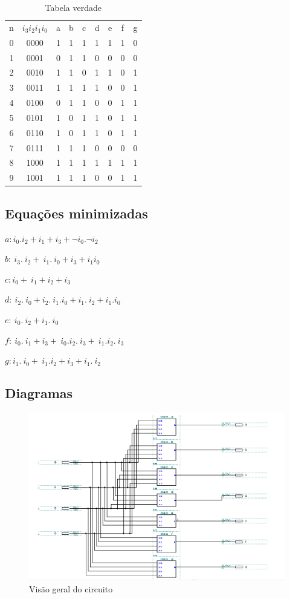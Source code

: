 \documentclass[a4paper]{article}
\begin{document}
\begin{table}[h]
\centering
\begin{tabular}{| *{9}{c |}}%
	\hline
	n\textordmasculine	&$i_3i_2i_1i_0$	&a &b &c &d &e &f &g \\
	0 &0000 &1 &1 &1 &1 &1 &1 &0 \\
	1 &0001 &0 &1 &1 &0 &0 &0 &0 \\
	2 &0010 &1 &1 &0 &1 &1 &0 &1 \\
	3 &0011 &1 &1 &1 &1 &0 &0 &1 \\
	4 &0100 &0 &1 &1 &0 &0 &1 &1 \\
	5 &0101 &1 &0 &1 &1 &0 &1 &1 \\
	6 &0110 &1 &0 &1 &1 &0 &1 &1 \\
	7 &0111 &1 &1 &1 &0 &0 &0 &0 \\
	8 &1000 &1 &1 &1 &1 &1 &1 &1 \\
	9 &1001 &1 &1 &1 &0 &0 &1 &1 \\ 
	\hline
\end{tabular}
\caption{Tabela verdade}
\end{table}

\subsection{Equações minimizadas}

$a: i_0.i_2 + i_1 + i_3 + \neg i_0.\neg i_2$

$b: ~i_3.~i_2 + ~i_1.~i_0 + i_3 + i_1i_0$

$c: i_0 + ~i_1 + i_2 + i_3$

$d: ~i_2.~i_0 + i_2.~i_1.i_0 + i_1.~i_2 + i_1.i_0$

$e: ~i_0.~i_2 + i_1.~i_0$

$f: ~i_0.~i_1 + i_3 + ~i_0.i_2.~i_3 + ~i_1.i_2.~i_3$

$g: i_1.~i_0 + ~i_1.i_2 + i_3 + i_1.~i_2$

\FloatBarrier
\subsection{Diagramas}

\begin{figure}[h!]
  \centering
  \includegraphics[scale=0.7]{dec_4-7.png}
  \caption{Visão geral do circuito}
\end{figure}
\end{document}
